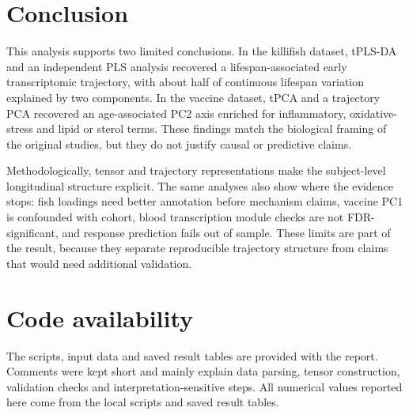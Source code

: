 \documentclass[11pt,a4paper]{article}
\begin{document}
\section{Conclusion}

This analysis supports two limited conclusions. In the killifish dataset, tPLS-DA and an independent PLS analysis recovered a lifespan-associated early transcriptomic trajectory, with about half of continuous lifespan variation explained by two components. In the vaccine dataset, tPCA and a trajectory PCA recovered an age-associated PC2 axis enriched for inflammatory, oxidative-stress and lipid or sterol terms. These findings match the biological framing of the original studies, but they do not justify causal or predictive claims.

Methodologically, tensor and trajectory representations make the subject-level longitudinal structure explicit. The same analyses also show where the evidence stops: fish loadings need better annotation before mechanism claims, vaccine PC1 is confounded with cohort, blood transcription module checks are not FDR-significant, and response prediction fails out of sample. These limits are part of the result, because they separate reproducible trajectory structure from claims that would need additional validation.

\section*{Code availability}

The scripts, input data and saved result tables are provided with the report. Comments were kept short and mainly explain data parsing, tensor construction, validation checks and interpretation-sensitive steps. All numerical values reported here come from the local scripts and saved result tables.

\FloatBarrier
\end{document}
